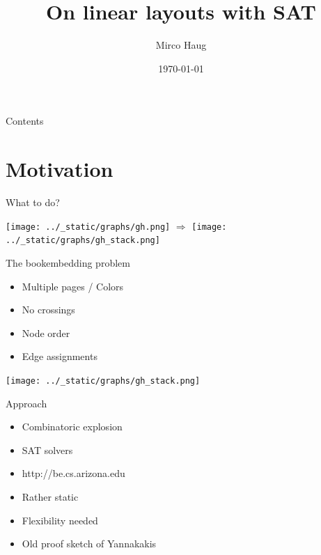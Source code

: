 \documentclass[11pt]{beamer}
\begin{document}
    \author{Mirco Haug}
    \title{On linear layouts with SAT}
    \date{\today}
    \begin{frame}
        \maketitle
    \end{frame}

    \begin{frame}{Contents}
        \tableofcontents
    \end{frame}

    \section{Motivation}\label{sec:motivation}

    \begin{frame}{What to do?}
        \begin{center}
            \texttt{[image: ../\_static/graphs/gh.png]} $\Rightarrow$
            \texttt{[image: ../\_static/graphs/gh\_stack.png]}
        \end{center}
    \end{frame}

    \begin{frame}{The bookembedding problem}
        \begin{itemize}
            \item Multiple pages / Colors
            \item No crossings
            \item Node order
            \item Edge assignments
        \end{itemize}
    \end{frame}

    \begin{frame}
        \texttt{[image: ../\_static/graphs/gh\_stack.png]}
    \end{frame}

    \begin{frame}{Approach}
        \begin{itemize}
            \item Combinatoric explosion
            \item SAT solvers
            \item http://be.cs.arizona.edu
            \item Rather static
            \item Flexibility needed
            \item Old proof sketch of Yannakakis\cite{DBLP:conf/stoc/Yannakakis86}
        \end{itemize}
    \end{frame}
\end{document}
